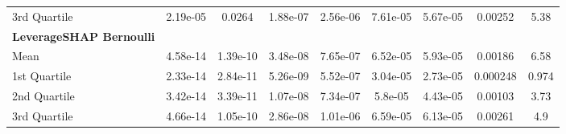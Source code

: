 {\begin{tabular} {lcccccccc}
\hspace{7pt}3rd Quartile & 2.19e-05 & \cellcolor{bronze!60}0.0264 & \cellcolor{bronze!60}1.88e-07 & \cellcolor{bronze!60}2.56e-06 & \cellcolor{silver!60}7.61e-05 & \cellcolor{gold!60}5.67e-05 & \cellcolor{gold!60}0.00252 & \cellcolor{silver!60}5.38 \\ 
\addlinespace[1ex] 
\textbf{LeverageSHAP Bernoulli} &  &  &  &  &  &  &  &  \\ 
\hspace{7pt}Mean & \cellcolor{silver!60}4.58e-14 & \cellcolor{silver!60}1.39e-10 & \cellcolor{gold!60}3.48e-08 & \cellcolor{silver!60}7.65e-07 & \cellcolor{silver!60}6.52e-05 & \cellcolor{gold!60}5.93e-05 & \cellcolor{silver!60}0.00186 & \cellcolor{silver!60}6.58 \\ 
\hspace{7pt}1st Quartile & \cellcolor{silver!60}2.33e-14 & \cellcolor{silver!60}2.84e-11 & \cellcolor{gold!60}5.26e-09 & \cellcolor{silver!60}5.52e-07 & \cellcolor{gold!60}3.04e-05 & \cellcolor{silver!60}2.73e-05 & \cellcolor{gold!60}0.000248 & \cellcolor{gold!60}0.974 \\ 
\hspace{7pt}2nd Quartile & \cellcolor{silver!60}3.42e-14 & \cellcolor{silver!60}3.39e-11 & \cellcolor{gold!60}1.07e-08 & \cellcolor{silver!60}7.34e-07 & \cellcolor{gold!60}5.8e-05 & \cellcolor{silver!60}4.43e-05 & \cellcolor{silver!60}0.00103 & \cellcolor{silver!60}3.73 \\ 
\hspace{7pt}3rd Quartile & \cellcolor{silver!60}4.66e-14 & \cellcolor{silver!60}1.05e-10 & \cellcolor{gold!60}2.86e-08 & \cellcolor{silver!60}1.01e-06 & \cellcolor{gold!60}6.59e-05 & \cellcolor{silver!60}6.13e-05 & \cellcolor{silver!60}0.00261 & \cellcolor{gold!60}4.9 \\ 
\bottomrule
\end{tabular}}